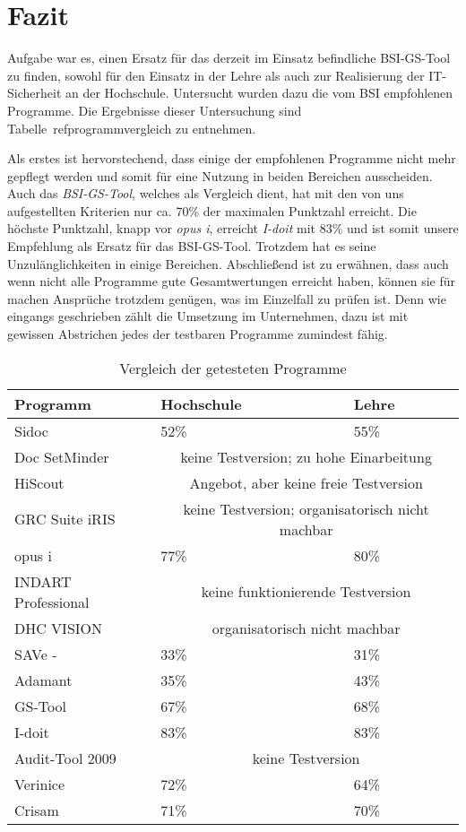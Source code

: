 \section{Fazit}
Aufgabe war es, einen Ersatz für das derzeit im Einsatz befindliche BSI-GS-Tool zu finden, sowohl für den Einsatz in der Lehre als auch zur Realisierung der IT-Sicherheit an der Hochschule. Untersucht wurden dazu die vom BSI empfohlenen Programme. Die Ergebnisse dieser Untersuchung sind Tabelle~ref{programmvergleich} zu entnehmen.

Als erstes ist hervorstechend, dass einige der empfohlenen Programme nicht mehr gepflegt werden und somit für eine Nutzung in beiden Bereichen ausscheiden. Auch das \textit{BSI-GS-Tool}, welches als Vergleich dient, hat mit den von uns aufgestellten Kriterien nur ca. 70\% der maximalen Punktzahl erreicht. Die höchste Punktzahl, knapp vor \textit{opus i}, erreicht \textit{I-doit} mit 83\% und ist somit unsere Empfehlung als Ersatz für das BSI-GS-Tool. Trotzdem hat es seine Unzulänglichkeiten in einige Bereichen. Abschließend ist zu erwähnen, dass auch wenn nicht alle Programme gute Gesamtwertungen erreicht haben, können sie für machen Ansprüche trotzdem genügen, was im Einzelfall zu prüfen ist. Denn wie eingangs geschrieben zählt die Umsetzung im Unternehmen, dazu ist mit gewissen Abstrichen jedes der testbaren Programme zumindest fähig.
\begin{table}[h!tb]
	\begin{tabular}{|p{}|p{}|p{}|}
		\hline 
		\textbf{Programm} & \textbf{Hochschule} & \textbf{Lehre}\\ 
		\hline
		Sidoc & 52\% & 55\% \\
		\hline 
		Doc SetMinder & \multicolumn{2}{c|}{keine Testversion; zu hohe Einarbeitung}\\
		\hline 
		HiScout & \multicolumn{2}{c|}{Angebot, aber keine freie Testversion} \\
		\hline 
		GRC Suite iRIS & \multicolumn{2}{c|}{keine Testversion; organisatorisch nicht machbar}\\
		\hline 
		opus i & 77\% & 80\% \\
		\hline
		INDART Professional & \multicolumn{2}{c|}{keine funktionierende Testversion} \\
		\hline 
		DHC VISION & \multicolumn{2}{c|}{organisatorisch nicht machbar} \\
		\hline 
		SAVe -  & 33\% & 31\% \\
		\hline 
		Adamant & 35\% & 43\%\\
		\hline 
		GS-Tool & 67\% & 68\% \\
		\hline  
		I-doit & 83\% & 83\% \\
		\hline
		Audit-Tool 2009 & \multicolumn{2}{c|}{keine Testversion} \\
		\hline
		Verinice & 72\% & 64\% \\
		\hline
		Crisam & 71\% & 70\% \\
		\hline
	\end{tabular} 
	\caption{Vergleich der getesteten Programme}
	\label{tab:programmvergleich}
\end{table}
